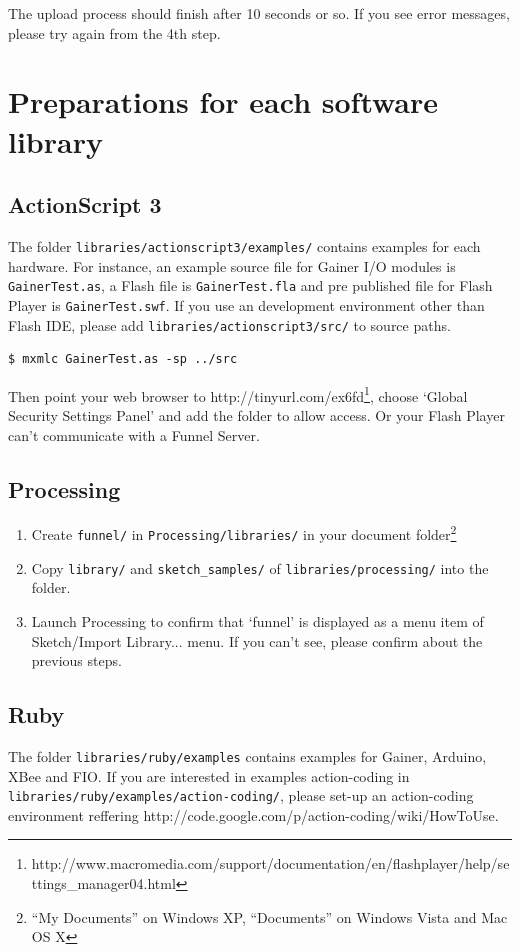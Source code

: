 \documentclass[9pt]{jsarticle}
\begin{document}
The upload process should finish after 10 seconds or so. If you see error messages, please try again from the 4th step.

\clearpage
\section{Preparations for each software library}
\subsection{ActionScript 3}
The folder \texttt{libraries/actionscript3/examples/} contains examples for each hardware. For instance, an example source file for Gainer I/O modules is \texttt{GainerTest.as}, a Flash file is \texttt{GainerTest.fla} and pre published file for Flash Player is \texttt{GainerTest.swf}. If you use an development environment other than Flash IDE, please add \texttt{libraries/actionscript3/src/} to source paths.

\begin{lstlisting}[caption={An example of compile options using mxmlc},label=useless]
$ mxmlc GainerTest.as -sp ../src
\end{lstlisting}

Then point your web browser to http://tinyurl.com/ex6fd\footnote{http://www.macromedia.com/support/documentation/en/flashplayer/help/settings\_manager04.html}, choose `Global Security Settings Panel' and add the folder to allow access. Or your Flash Player can't communicate with a Funnel Server.

\subsection{Processing}
\begin{enumerate}
\item Create \texttt{funnel/} in \texttt{Processing/libraries/} in your document folder\footnote{``My Documents'' on Windows XP, ``Documents'' on Windows Vista and Mac OS X}
\item Copy \texttt{library/} and \texttt{sketch\_samples/} of \texttt{libraries/processing/} into the folder.
\item Launch Processing to confirm that `funnel' is displayed as a menu item of Sketch/Import Library... menu. If you can't see, please confirm about the previous steps.
\end{enumerate}

\subsection{Ruby}
The folder \texttt{libraries/ruby/examples} contains examples for Gainer, Arduino, XBee and FIO. If you are interested in examples action-coding in \texttt{libraries/ruby/examples/action-coding/}, please set-up an action-coding environment reffering http://code.google.com/p/action-coding/wiki/HowToUse.
\end{document}
